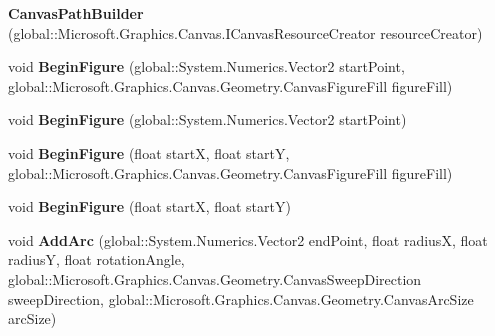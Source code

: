 \begin{DoxyCompactItemize}
\item 
\mbox{\label{class_microsoft_1_1_graphics_1_1_canvas_1_1_geometry_1_1_canvas_path_builder_a670ec4a87a7f5f8c9ee492317da23aa3}} 
{\bfseries Canvas\+Path\+Builder} (global\+::\+Microsoft.\+Graphics.\+Canvas.\+I\+Canvas\+Resource\+Creator resource\+Creator)
\item 
\mbox{\label{class_microsoft_1_1_graphics_1_1_canvas_1_1_geometry_1_1_canvas_path_builder_af7a65d1c4ea84486b8567a452abaaa82}} 
void {\bfseries Begin\+Figure} (global\+::\+System.\+Numerics.\+Vector2 start\+Point, global\+::\+Microsoft.\+Graphics.\+Canvas.\+Geometry.\+Canvas\+Figure\+Fill figure\+Fill)
\item 
\mbox{\label{class_microsoft_1_1_graphics_1_1_canvas_1_1_geometry_1_1_canvas_path_builder_a58b72d59626692a590f9613507b1613d}} 
void {\bfseries Begin\+Figure} (global\+::\+System.\+Numerics.\+Vector2 start\+Point)
\item 
\mbox{\label{class_microsoft_1_1_graphics_1_1_canvas_1_1_geometry_1_1_canvas_path_builder_a13ecf54f872f85460fbe3ea214d7b143}} 
void {\bfseries Begin\+Figure} (float startX, float startY, global\+::\+Microsoft.\+Graphics.\+Canvas.\+Geometry.\+Canvas\+Figure\+Fill figure\+Fill)
\item 
\mbox{\label{class_microsoft_1_1_graphics_1_1_canvas_1_1_geometry_1_1_canvas_path_builder_accd5484b3a6afe779cc05b671ceab2d6}} 
void {\bfseries Begin\+Figure} (float startX, float startY)
\item 
\mbox{\label{class_microsoft_1_1_graphics_1_1_canvas_1_1_geometry_1_1_canvas_path_builder_ad5ebacfef42f16ddadc505b289750362}} 
void {\bfseries Add\+Arc} (global\+::\+System.\+Numerics.\+Vector2 end\+Point, float radiusX, float radiusY, float rotation\+Angle, global\+::\+Microsoft.\+Graphics.\+Canvas.\+Geometry.\+Canvas\+Sweep\+Direction sweep\+Direction, global\+::\+Microsoft.\+Graphics.\+Canvas.\+Geometry.\+Canvas\+Arc\+Size arc\+Size)

\end{DoxyCompactItemize}
